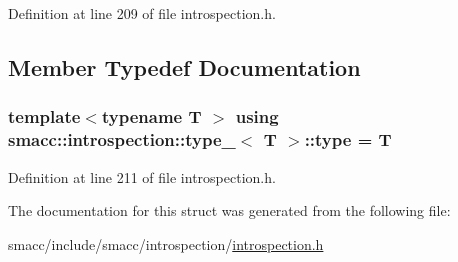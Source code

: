 Definition at line 209 of file introspection.\+h.



\subsection{Member Typedef Documentation}
\subsubsection[{\texorpdfstring{type}{type}}]{\setlength{\rightskip}{0pt plus 5cm}template$<$typename T $>$ using {\bf smacc\+::introspection\+::type\+\_\+}$<$ T $>$\+::{\bf type} =  T}\hypertarget{structsmacc_1_1introspection_1_1type___afe9e4516cea9d3160f2eff1b787ca4f5}{}\label{structsmacc_1_1introspection_1_1type___afe9e4516cea9d3160f2eff1b787ca4f5}


Definition at line 211 of file introspection.\+h.



The documentation for this struct was generated from the following file\+:\begin{DoxyCompactItemize}
\item 
smacc/include/smacc/introspection/\hyperlink{introspection_8h}{introspection.\+h}\end{DoxyCompactItemize}

